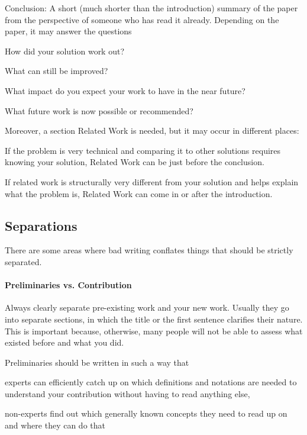 \documentclass[12pt]{article}
\begin{document}
\begin{compactitem}
\item Conclusion: A short (much shorter than the introduction) summary of the paper from the perspective of someone who has read it already.
Depending on the paper, it may answer the questions
 \begin{compactitem}
  \item How did your solution work out?
  \item What can still be improved?
  \item What impact do you expect your work to have in the near future?
  \item What future work is now possible or recommended?
 \end{compactitem}
\end{compactitem}
Moreover, a section Related Work is needed, but it may occur in different places:
 \begin{compactitem}
  \item If the problem is very technical and comparing it to other solutions requires knowing your solution, Related Work can be just before the conclusion.
  \item If related work is structurally very different from your solution and helps explain what the problem is, Related Work can come in or after the introduction.
 \end{compactitem}

\subsection{Separations}

There are some areas where bad writing conflates things that should be strictly separated.

\paragraph{Preliminaries vs. Contribution}
Always clearly separate pre-existing work and your new work.
Usually they go into separate sections, in which the title or the first sentence clarifies their nature.
This is important because, otherwise, many people will not be able to assess what existed before and what you did.

Preliminaries should be written in such a way that
\begin{compactitem}
 \item experts can efficiently catch up on which definitions and notations are needed to understand your contribution without having to read anything else,
 \item non-experts find out which generally known concepts they need to read up on and where they can do that
\end{compactitem}
\end{document}

